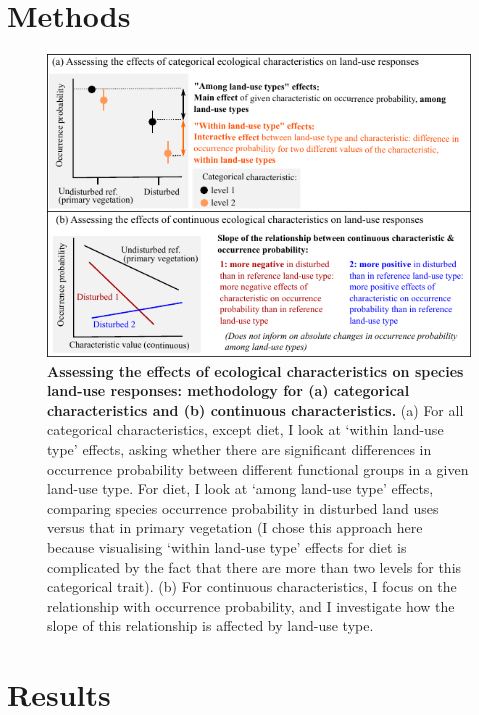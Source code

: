 \clearpage

\section{Methods}

\begin{figure}[h!]
\centering
\includegraphics[scale=1.6]{figures/Chapter4/Figure2}
\caption[Assessing the effects of ecological characteristics on species land-use responses: methodology for (a) categorical characteristics and (b) continuous characteristics.]{\textbf{Assessing the effects of ecological characteristics on species land-use responses: methodology for (a) categorical characteristics and (b) continuous characteristics.} (a) For all categorical characteristics, except diet, I look at `within land-use type' effects, asking whether there are significant differences in occurrence probability between different functional groups in a given land-use type. For diet, I look at `among land-use type' effects, comparing species occurrence probability in disturbed land uses versus that in primary vegetation  (I chose this approach here because visualising `within land-use type' effects for diet is complicated by the fact that there are more than two levels for this categorical trait). (b) For continuous characteristics, I focus on the relationship with occurrence probability, and I investigate how the slope of this relationship is affected by land-use type. }
\label{chap4_fig2}
\end{figure}


\section{Results}


